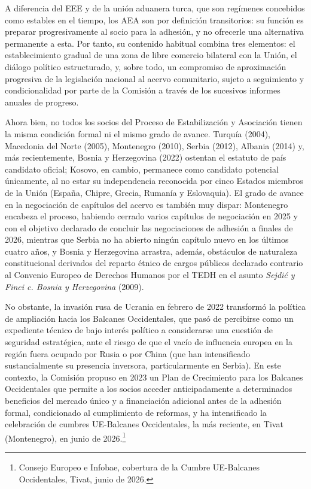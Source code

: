 \documentclass[10pt,a4paper]{article}
\begin{document}
A diferencia del EEE y de la unión aduanera turca, que son regímenes concebidos como estables en el tiempo, los AEA son por definición transitorios: su función es preparar progresivamente al socio para la adhesión, y no ofrecerle una alternativa permanente a esta. Por tanto, su contenido habitual combina tres elementos: el establecimiento gradual de una zona de libre comercio bilateral con la Unión, el diálogo político estructurado, y, sobre todo, un compromiso de aproximación progresiva de la legislación nacional al acervo comunitario, sujeto a seguimiento y condicionalidad por parte de la Comisión a través de los sucesivos informes anuales de progreso.

Ahora bien, no todos los socios del Proceso de Estabilización y Asociación tienen la misma condición formal ni el mismo grado de avance. Turquía (2004), Macedonia del Norte (2005), Montenegro (2010), Serbia (2012), Albania (2014) y, más recientemente, Bosnia y Herzegovina (2022) ostentan el estatuto de país candidato oficial; Kosovo, en cambio, permanece como candidato potencial únicamente, al no estar su independencia reconocida por cinco Estados miembros de la Unión (España, Chipre, Grecia, Rumanía y Eslovaquia). El grado de avance en la negociación de capítulos del acervo es también muy dispar: Montenegro encabeza el proceso, habiendo cerrado varios capítulos de negociación en 2025 y con el objetivo declarado de concluir las negociaciones de adhesión a finales de 2026, mientras que Serbia no ha abierto ningún capítulo nuevo en los últimos cuatro años, y Bosnia y Herzegovina arrastra, además, obstáculos de naturaleza constitucional derivados del reparto étnico de cargos públicos declarado contrario al Convenio Europeo de Derechos Humanos por el TEDH en el asunto \textit{Sejdić y Finci c. Bosnia y Herzegovina} (2009).

No obstante, la invasión rusa de Ucrania en febrero de 2022 transformó la política de ampliación hacia los Balcanes Occidentales, que pasó de percibirse como un expediente técnico de bajo interés político a considerarse una cuestión de seguridad estratégica, ante el riesgo de que el vacío de influencia europea en la región fuera ocupado por Rusia o por China (que han intensificado sustancialmente su presencia inversora, particularmente en Serbia). En este contexto, la Comisión propuso en 2023 un Plan de Crecimiento para los Balcanes Occidentales que permite a los socios acceder anticipadamente a determinados beneficios del mercado único y a financiación adicional antes de la adhesión formal, condicionado al cumplimiento de reformas, y ha intensificado la celebración de cumbres UE-Balcanes Occidentales, la más reciente, en Tivat (Montenegro), en junio de 2026.\footnote{%
    Consejo Europeo e Infobae, cobertura de la Cumbre UE-Balcanes Occidentales, Tivat, junio de 2026.
}
\end{document}
